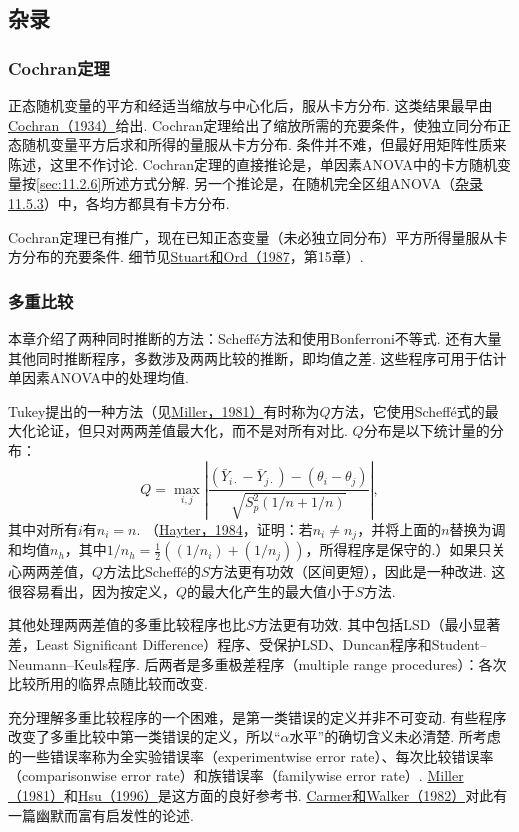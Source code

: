 \subsection{杂录}\label{sec:11.5}
\subsubsection{Cochran定理}\label{sec:11.5.1}
正态随机变量的平方和经适当缩放与中心化后，服从卡方分布. 这类结果最早由\hyperref[bib:source80]{Cochran（1934）}给出. Cochran定理给出了缩放所需的充要条件，使独立同分布正态随机变量平方后求和所得的量服从卡方分布. 条件并不难，但最好用矩阵性质来陈述，这里不作讨论. Cochran定理的直接推论是，单因素ANOVA中的卡方随机变量按\autoref{sec:11.2.6}所述方式分解. 另一个推论是，在随机完全区组ANOVA（\hyperref[sec:11.5.3]{杂录11.5.3}）中，各均方都具有卡方分布.

Cochran定理已有推广，现在已知正态变量（未必独立同分布）平方所得量服从卡方分布的充要条件. 细节见\hyperref[bib:source309]{Stuart和Ord（1987}，第15章）.

\subsubsection{多重比较}\label{sec:11.5.2}
本章介绍了两种同时推断的方法：Scheff\'e方法和使用Bonferroni不等式. 还有大量其他同时推断程序，多数涉及两两比较的推断，即均值之差. 这些程序可用于估计单因素ANOVA中的处理均值.

Tukey提出的一种方法（见\hyperref[bib:source221]{Miller，1981）}有时称为$Q$方法，它使用Scheff\'e式的最大化论证，但只对两两差值最大化，而不是对所有对比. $Q$分布是以下统计量的分布：
$$Q=\max_{i,j}\left|\frac{(\bar Y_{i\cdot}-\bar Y_{j\cdot})-(\theta_i-\theta_j)}{\sqrt{S_p^2(1/n+1/n)}}\right|,$$
其中对所有$i$有$n_i=n$. （\hyperref[bib:source164]{Hayter，1984}，证明：若$n_i\ne n_j$，并将上面的$n$替换为调和均值$n_h$，其中$1/n_h=\tfrac12((1/n_i)+(1/n_j))$，所得程序是保守的.）如果只关心两两差值，$Q$方法比Scheff\'e的$S$方法更有功效（区间更短），因此是一种改进. 这很容易看出，因为按定义，$Q$的最大化产生的最大值小于$S$方法.

其他处理两两差值的多重比较程序也比$S$方法更有功效. 其中包括LSD（最小显著差，Least Significant Difference）程序、受保护LSD、Duncan程序和Student--Neumann--Keuls程序. 后两者是多重极差程序（multiple range procedures）：各次比较所用的临界点随比较而改变.

充分理解多重比较程序的一个困难，是第一类错误的定义并非不可变动. 有些程序改变了多重比较中第一类错误的定义，所以“$\alpha$水平”的确切含义未必清楚. 所考虑的一些错误率称为全实验错误率（experimentwise error rate）、每次比较错误率（comparisonwise error rate）和族错误率（familywise error rate）. \hyperref[bib:source221]{Miller（1981）}和\hyperref[bib:source169]{Hsu（1996）}是这方面的良好参考书. \hyperref[bib:source58]{Carmer和Walker（1982）}对此有一篇幽默而富有启发性的论述.

